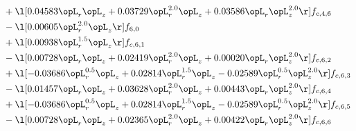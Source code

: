 \begin{alignat}{2}
& + \l[  0.04583 \opL_r \opL_z +  0.03729 \opL_r^{2.0} \opL_z +  0.03586 \opL_r \opL_z^{2.0}  \r] f_{c,4,6} \nonumber \\ 
& - \l[  0.00605 \opL_r^{2.0} \opL_z  \r] f_{6,0} \nonumber \\ 
& + \l[  0.00938 \opL_r^{1.5} \opL_z  \r] f_{c,6,1} \nonumber \\ 
& - \l[  0.00728 \opL_r \opL_z +  0.02419 \opL_r^{2.0} \opL_z +  0.00020 \opL_r \opL_z^{2.0}  \r] f_{c,6,2} \nonumber \\ 
& + \l[  -0.03686 \opL_r^{0.5} \opL_z +  0.02814 \opL_r^{1.5} \opL_z   -0.02589 \opL_r^{0.5} \opL_z^{2.0}  \r] f_{c,6,3} \nonumber \\ 
& - \l[  0.01457 \opL_r \opL_z +  0.03628 \opL_r^{2.0} \opL_z +  0.00443 \opL_r \opL_z^{2.0}  \r] f_{c,6,4} \nonumber \\ 
& + \l[  -0.03686 \opL_r^{0.5} \opL_z +  0.02814 \opL_r^{1.5} \opL_z   -0.02589 \opL_r^{0.5} \opL_z^{2.0}  \r] f_{c,6,5} \nonumber \\ 
& - \l[  0.00728 \opL_r \opL_z +  0.02365 \opL_r^{2.0} \opL_z +  0.00422 \opL_r \opL_z^{2.0}  \r] f_{c,6,6} \nonumber \\ 
\end{alignat} 


